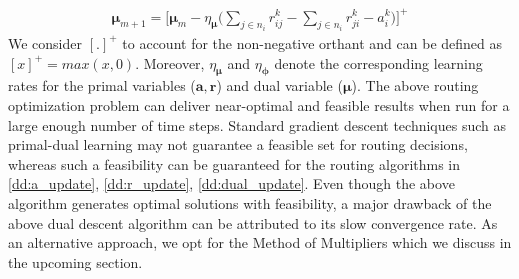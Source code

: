 \documentclass[lettersize,journal]{IEEEtran}
\begin{document}
\begin{multline} \label{dd:dual_update}
    \bm{\mu}_{m+1} = \Bigg[ \bm{\mu}_m - \eta_{\bm{\mu}} \Big( \sum_{j \in n_i} r_{ij}^k - \sum_{j \in n_i} r_{ji}^k - a_i^k\Big) \Bigg]^+
\end{multline}
We consider $[.]^+$ to account for the non-negative orthant and can be defined as $[x]^+ = max(x,0)$. Moreover, $\eta_{\bm{\mu}}$ and $\eta_{\bm{\phi}}$ denote the corresponding learning rates for the primal variables ($\bm{a,r}$) and dual variable ($\bm{\mu}$). The above routing optimization problem can deliver near-optimal and feasible results when run for a large enough number of time steps. Standard gradient descent techniques such as primal-dual learning may not guarantee a feasible set for routing decisions, whereas such a feasibility can be guaranteed for the routing algorithms in \eqref{dd:a_update}, \eqref{dd:r_update}, \eqref{dd:dual_update}. Even though the above algorithm generates optimal solutions with feasibility, a major drawback of the above dual descent algorithm can be attributed to its slow convergence rate. As an alternative approach, we opt for the Method of Multipliers which we discuss in the upcoming section.
\end{document}

